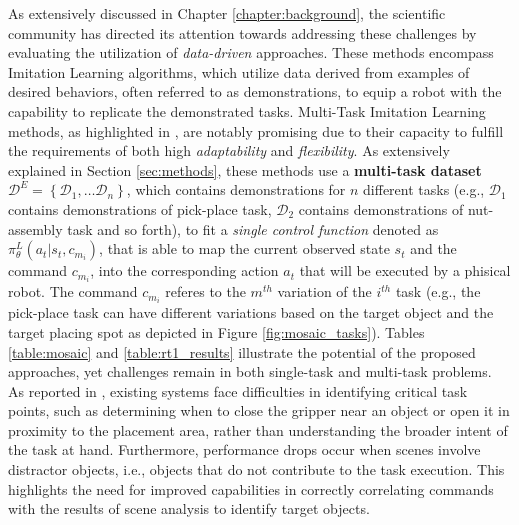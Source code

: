 As extensively discussed in Chapter \ref{chapter:background}, the scientific community has directed its attention towards addressing these challenges by evaluating the utilization of \textit{data-driven} approaches. These methods encompass Imitation Learning algorithms, which utilize data derived from examples of desired behaviors, often referred to as demonstrations, to equip a robot with the capability to replicate the demonstrated tasks.
\newline Multi-Task Imitation Learning methods, as highlighted in \cite{jang2022bc_z, dasari2021transformers_one_shot, mandi2022towards_more_generalizable_one_shot, brohan2022rt}, are notably promising due to their capacity to fulfill the requirements of both high \textit{adaptability} and \textit{flexibility}. As extensively explained in Section \ref{sec:methods}, these methods use a \textbf{multi-task dataset} $\mathcal{D}^{E} = \left \{ \mathcal{D}_{1}, \dots \mathcal{D}_{n}\right \}$, which contains demonstrations for $n$ different tasks (e.g., $\mathcal{D}_{1}$ contains demonstrations of pick-place task, $\mathcal{D}_{2}$ contains demonstrations of nut-assembly task and so forth), to fit a \textit{single control function} denoted as $\pi^{L}_{\theta}(a_{t}|s_{t}, c_{m_{i}})$, that is able to map the current observed state $s_{t}$ and the command $c_{m_{i}}$, into the corresponding action $a_{t}$ that will be executed by a phisical robot. The command $c_{m_{i}}$ referes to the $m^{th}$ variation of the $i^{th}$ task (e.g., the pick-place task can have different variations based on the target object and the target placing spot as depicted in Figure \ref{fig:mosaic_tasks}). Tables \ref{table:mosaic} and \ref{table:rt1_results} illustrate the potential of the proposed approaches, yet challenges remain in both single-task and multi-task problems. As reported in \cite{jang2022bc_z, yu2018daml}, existing systems face difficulties in identifying critical task points, such as determining when to close the gripper near an object or open it in proximity to the placement area, rather than understanding the broader intent of the task at hand. Furthermore, performance drops occur when scenes involve distractor objects, i.e.,  objects  that  do  not  contribute  to  the  task  execution. This highlights the need for improved capabilities in correctly correlating commands with the results of scene analysis to identify target objects.

